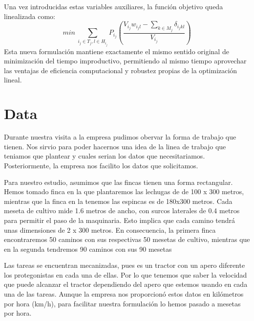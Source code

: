     Una vez introducidas estas variables auxiliares, la función objetivo queda linealizada como:
	\[
        min\ \sum_{i_j \in T_j, l\in H_{i_j}}P_{i_j}\left(\frac{V_{i_j}w_{i_j l}-\sum_{k\in M_j}\delta_{i_j k l}}{V_{i_j}}\right)
    \]
	Esta nueva formulación mantiene exactamente el mismo sentido original de minimización del tiempo improductivo,
    permitiendo al mismo tiempo aprovechar las ventajas de eficiencia computacional y robustez propias de la optimización lineal.



\chapter*{Data}
Durante nuestra visita a la empresa pudimos obervar la forma de trabajo que tienen. Nos sirvio para poder hacernos una idea de la linea 
de trabajo que teniamos que plantear y cuales serian los datos que necesitariamos. Posteriormente, la empresa nos facilito los
datos que solicitamos.

Para nuestro estudio, asumimos que las fincas tienen una forma rectangular. Hemos tomado finca en la que plantaremos las lechugas de
de 100 x 300 metros, mientras que la finca en la tenemos las espincas es de 180x300 metros. Cada meseta de cultivo mide 1.6 metros de ancho, 
con surcos laterales de 0.4 metros para permitir el paso de la maquinaria. Esto implica que cada camino tendrá unas dimensiones de 2 x 300 metros.
En consecuencia, la primera finca encontraremos 50 caminos con sus respectivas 50 mesetas de cultivo, mientras que en la segunda tendremos 
90 caminos con sus 90 mesetas

Las tareas se encuentran mecanizadas, pues es un tractor con un apero diferente los protegonistas en cada una de ellas. Por lo que tenemos 
que saber la velocidad que puede alcanzar el tractor dependiendo del apero que estemos usando en cada una de las tareas. 
 Aunque la empresa nos proporcionó estos datos en kilómetros por hora (km/h), para facilitar nuestra formulación lo hemos pasado a mesetas por hora.

